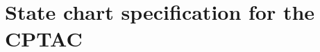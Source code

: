 \documentclass[Main_Assignment2]{subfiles}
\begin{document}
\section{State chart specification for the CPTAC}
\end{document}
